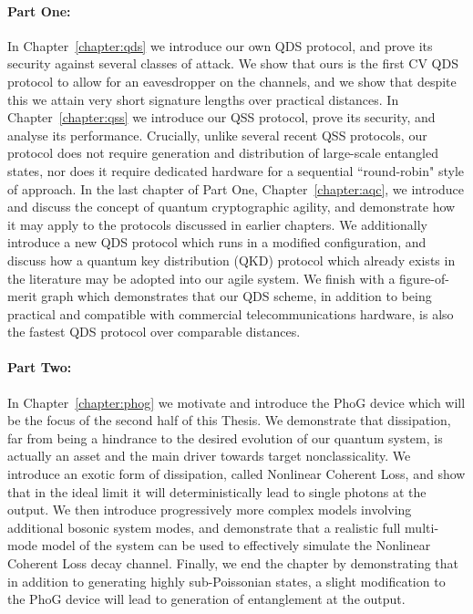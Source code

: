 \paragraph{Part One:} In Chapter~\ref{chapter:qds} we introduce our own QDS protocol, and prove its security against several classes of attack. We show that ours is the first CV QDS protocol to allow for an eavesdropper on the channels, and we show that despite this we attain very short signature lengths over practical distances. In Chapter~\ref{chapter:qss} we introduce our QSS protocol, prove its security, and analyse its performance. Crucially, unlike several recent QSS protocols, our protocol does not require generation and distribution of large-scale entangled states, nor does it require dedicated hardware for a sequential ``round-robin" style of approach. In the last chapter of Part One, Chapter~\ref{chapter:aqc}, we introduce and discuss the concept of quantum cryptographic agility, and demonstrate how it may apply to the protocols discussed in earlier chapters. We additionally introduce a new QDS protocol which runs in a modified configuration, and discuss how a quantum key distribution (QKD) protocol which already exists in the literature may be adopted into our agile system. We finish with a figure-of-merit graph which demonstrates that our QDS scheme, in addition to being practical and compatible with commercial telecommunications hardware, is also the fastest QDS protocol over comparable distances. 

\paragraph{Part Two:} In Chapter~\ref{chapter:phog} we motivate and introduce the PhoG device which will be the focus of the second half of this Thesis. We demonstrate that dissipation, far from being a hindrance to the desired evolution of our quantum system, is actually an asset and the main driver towards target nonclassicality. We introduce an exotic form of dissipation, called Nonlinear Coherent Loss, and show that in the ideal limit it will deterministically lead to single photons at the output. We then introduce progressively more complex models involving additional bosonic system modes, and demonstrate that a realistic full multi-mode model of the system can be used to effectively simulate the Nonlinear Coherent Loss decay channel. Finally, we end the chapter by demonstrating that in addition to generating highly sub-Poissonian states, a slight modification to the PhoG device will lead to generation of entanglement at the output.

